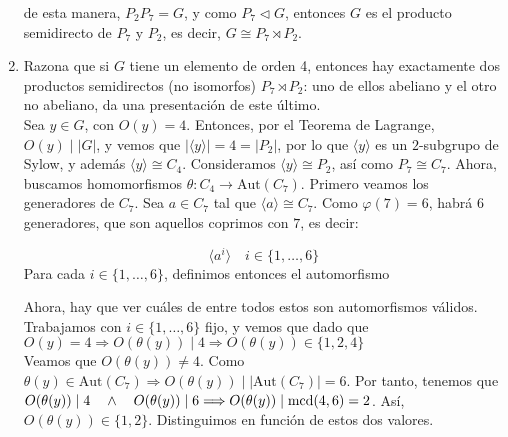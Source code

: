 \documentclass[12pt]{article}
\newcommand{\Aut}{\text{Aut}}
\begin{document}
\begin{ejercicio}[2 puntos]
\begin{enumerate}[label=(\alph*)]
            de esta manera, $P_2 P_7 = G$, y como $P_7 \vartriangleleft G$, entonces $G$ es el producto semidirecto de $P_7$ y $P_2$, es decir, $G \cong P_7 \rtimes P_2$.

            \item Razona que si $G$ tiene un elemento de orden 4, entonces hay exactamente dos productos semidirectos (no isomorfos) $P_7 \rtimes P_2$: uno de ellos abeliano y el otro no abeliano, da una presentación de este último. \\
            
            Sea $y \in G$, con $O(y) = 4$. Entonces, por el Teorema de Lagrange, $O(y) \mid |G|$, y vemos que $|\langle y \rangle| = 4 = |P_2|$, por lo que $ \langle y \rangle$ es un $2$-subgrupo de Sylow, y además $ \langle y \rangle \cong C_4$.
            Consideramos $\langle y \rangle \cong P_2$, así como $P_7 \cong C_7$. Ahora, buscamos homomorfismos $\theta : C_4 \to \Aut(C_7)$. Primero veamos los generadores de $C_7$. Sea $a \in C_7$ tal que $\langle a \rangle \cong C_7$. Como $\varphi(7) = 6$, habrá 6 generadores, que son aquellos
            coprimos con $7$, es decir:

            $$\langle a^{i} \rangle \quad i \in \{1, \ldots, 6\}$$ Para cada $i \in \{1, \ldots, 6\}$, definimos entonces el automorfismo 

            Ahora, hay que ver cuáles de entre todos estos son automorfismos válidos. Trabajamos con $i \in \{1, \ldots, 6\}$ fijo, y vemos que dado que $O(y) = 4 \Longrightarrow O(\theta(y)) \mid 4 \Longrightarrow O(\theta(y)) \in \{1, 2, 4\}$ \\

            Veamos que $O(\theta(y)) \neq 4$. Como $\theta(y) \in \Aut(C_7) \Longrightarrow O(\theta(y)) \mid |\Aut(C_7)| = 6$. Por tanto, tenemos que $O(\theta(y)) \mid 4 \quad \land \quad O(\theta(y)) \mid 6 \Longrightarrow O(\theta(y)) \mid \operatorname{mcd}(4,6) = 2$. Así, $O(\theta(y)) \in \{1,2\}$. Distinguimos
            en función de estos dos valores.


\end{enumerate}
\end{ejercicio}
\end{document}
